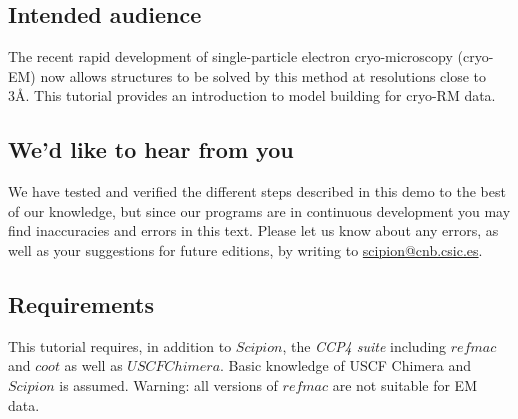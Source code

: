\documentclass[12pt]{article} %
\begin{document}


\subsection*{Intended audience}
The recent rapid development of single-particle electron cryo-microscopy (cryo-EM) now allows structures to be solved by this method at resolutions close to 3\AA.  This tutorial provides an introduction to model building for cryo-RM data. %


\subsection*{We'd like to hear from you}

We have tested and verified the different steps described in this demo
to the best of our knowledge, but since our programs are in continuous
development you may find inaccuracies and errors in this text. Please
let us know about any errors, as well as your suggestions for
future editions, by writing to
\href{mailto:scipion@cnb.csic.es}{scipion@cnb.csic.es}.


\subsection*{Requirements}

This tutorial requires, in addition to $Scipion$,  the \textit{CCP4 suite} including $refmac$ and $coot$ as well as $USCF Chimera$. Basic knowledge of USCF Chimera and $Scipion$ is assumed. Warning: all versions of $refmac$ are not suitable for EM data. 



\newpage


\end{document}
